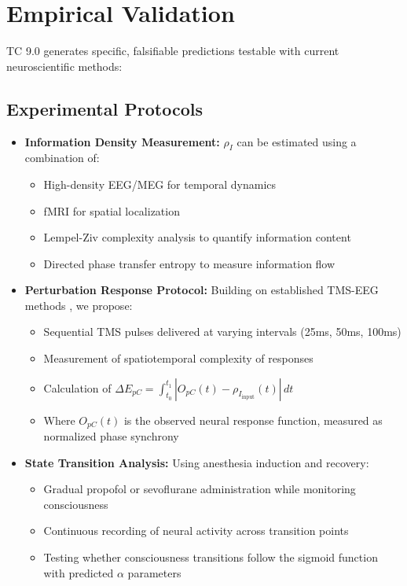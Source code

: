 \documentclass[12pt]{article}
\begin{document}
\section{Empirical Validation}
TC 9.0 generates specific, falsifiable predictions testable with current neuroscientific methods:

\subsection{Experimental Protocols}

\begin{itemize}
    \item \textbf{Information Density Measurement:} $\rho_I$ can be estimated using a combination of:
    \begin{itemize}[label=--]
        \item High-density EEG/MEG for temporal dynamics
        \item fMRI for spatial localization
        \item Lempel-Ziv complexity analysis to quantify information content \cite{schartner2015,casali2013}
        \item Directed phase transfer entropy to measure information flow \cite{hillebrand2016}
    \end{itemize}
    
    \item \textbf{Perturbation Response Protocol:} Building on established TMS-EEG methods \cite{casarotto2016}, we propose:
    \begin{itemize}[label=--]
        \item Sequential TMS pulses delivered at varying intervals (25ms, 50ms, 100ms)
        \item Measurement of spatiotemporal complexity of responses
        \item Calculation of $\Delta E_{pC} = \int_{t_0}^{t_1} |O_{pC}(t) - \rho_{I_{\text{input}}}(t)| \, dt$
        \item Where $O_{pC}(t)$ is the observed neural response function, measured as normalized phase synchrony
    \end{itemize}
    
    \item \textbf{State Transition Analysis:} Using anesthesia induction and recovery:
    \begin{itemize}[label=--]
        \item Gradual propofol or sevoflurane administration while monitoring consciousness
        \item Continuous recording of neural activity across transition points
        \item Testing whether consciousness transitions follow the sigmoid function with predicted $\alpha$ parameters
    \end{itemize}
    

\end{itemize}
\end{document}
